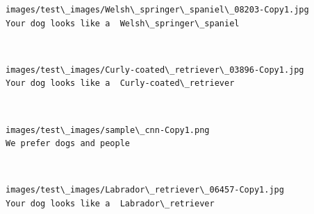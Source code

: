 \documentclass[11pt]{article}
\begin{document}
    \begin{Verbatim}[commandchars=\\\{\}]
images/test\_images/Welsh\_springer\_spaniel\_08203-Copy1.jpg
Your dog looks like a  Welsh\_springer\_spaniel

    \end{Verbatim}

    \begin{center}
    \end{center}
    { \hspace*{\fill} \\}
    
    \begin{Verbatim}[commandchars=\\\{\}]
images/test\_images/Curly-coated\_retriever\_03896-Copy1.jpg
Your dog looks like a  Curly-coated\_retriever

    \end{Verbatim}

    \begin{center}
    \end{center}
    { \hspace*{\fill} \\}
    
    \begin{Verbatim}[commandchars=\\\{\}]
images/test\_images/sample\_cnn-Copy1.png
We prefer dogs and people

    \end{Verbatim}

    \begin{center}
    \end{center}
    { \hspace*{\fill} \\}
    
    \begin{Verbatim}[commandchars=\\\{\}]
images/test\_images/Labrador\_retriever\_06457-Copy1.jpg
Your dog looks like a  Labrador\_retriever

    \end{Verbatim}

    \begin{center}
    \end{center}
    { \hspace*{\fill} \\}
    
\end{document}
